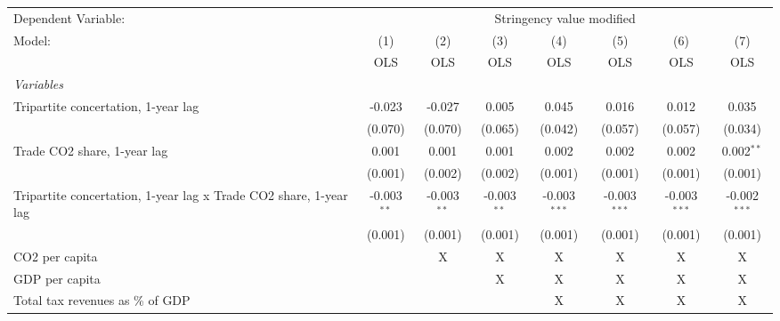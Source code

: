 
\begingroup
\centering
\begin{tabular}{lccccccc}
   \toprule
   Dependent Variable: & \multicolumn{7}{c}{Stringency value modified}\\
   Model:                                                            & (1)           & (2)           & (3)           & (4)            & (5)            & (6)            & (7)\\  
                                                                     &  OLS          & OLS           & OLS           & OLS            & OLS            & OLS            & OLS\\  
   \midrule
   \emph{Variables}\\
   Tripartite concertation, 1-year lag                               & -0.023        & -0.027        & 0.005         & 0.045          & 0.016          & 0.012          & 0.035\\   
                                                                     & (0.070)       & (0.070)       & (0.065)       & (0.042)        & (0.057)        & (0.057)        & (0.034)\\   
   Trade CO2 share, 1-year lag                                       & 0.001         & 0.001         & 0.001         & 0.002          & 0.002          & 0.002          & 0.002$^{**}$\\   
                                                                     & (0.001)       & (0.002)       & (0.002)       & (0.001)        & (0.001)        & (0.001)        & (0.001)\\   
   Tripartite concertation, 1-year lag x Trade CO2 share, 1-year lag & -0.003$^{**}$ & -0.003$^{**}$ & -0.003$^{**}$ & -0.003$^{***}$ & -0.003$^{***}$ & -0.003$^{***}$ & -0.002$^{***}$\\   
                                                                     & (0.001)       & (0.001)       & (0.001)       & (0.001)        & (0.001)        & (0.001)        & (0.001)\\   
   CO2 per capita                                                    &               & X             & X             & X              & X              & X              & X\\  
   GDP per capita                                                    &               &               & X             & X              & X              & X              & X\\  
   Total tax revenues as \% of GDP                                   &               &               &               & X              & X              & X              & X\\  

\end{tabular}
